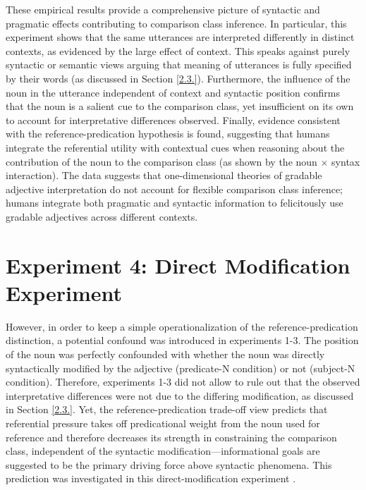These empirical results provide a comprehensive picture of syntactic and pragmatic effects contributing to comparison class inference. In particular, this experiment shows that the same utterances are interpreted differently in distinct contexts, as evidenced by the large effect of context. This speaks against purely syntactic or semantic views arguing that meaning of utterances is fully specified by their words (as discussed in Section \ref{2.3.}). Furthermore, the influence of the noun in the utterance independent of context and syntactic position confirms that the noun is a salient cue to the comparison class, yet insufficient on its own to account for interpretative differences observed. Finally, evidence consistent with the reference-predication hypothesis is found, suggesting that humans integrate the referential utility with contextual cues when reasoning about the contribution of the noun to the comparison class (as shown by the noun $\times$ syntax interaction). The data suggests that one-dimensional theories of gradable adjective interpretation do not account for flexible comparison class inference; humans integrate both pragmatic and syntactic information to felicitously use gradable adjectives across different contexts. 

\section{Experiment 4: Direct Modification Experiment} 
However, in order to keep a simple operationalization of the reference-predication distinction, a potential confound was introduced in experiments 1-3. The position of the noun was perfectly confounded with whether the noun was directly syntactically modified by the adjective (predicate-N condition) or not (subject-N condition). Therefore, experiments 1-3 did not allow to rule out that the observed interpretative differences were not due to the differing modification, as discussed in Section \ref{2.3.}.  Yet, the reference-predication trade-off view predicts that referential pressure takes off predicational weight from the noun used for reference and therefore decreases its strength in constraining the comparison class, independent of the syntactic modification---informational goals are suggested to be the primary driving force above syntactic phenomena. This prediction was investigated in this direct-modification experiment \parencite{TesslerEtAl2020AMLaP}.

